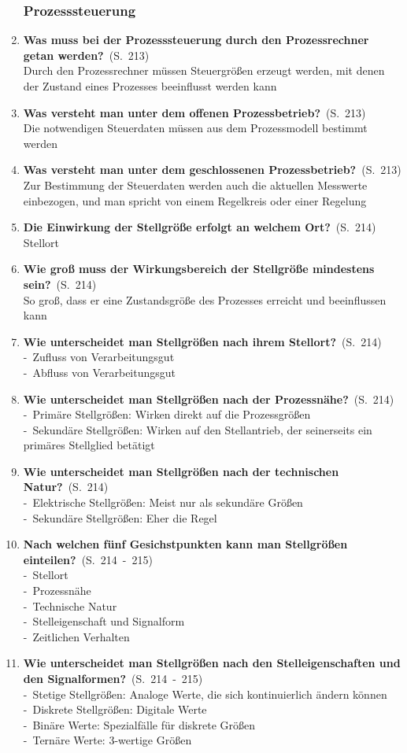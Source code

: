 \documentclass[a4paper,12pt]{article}
\newcommand{\question}[3]{\pagebreak[3]\item {\textbf{#1?}}\ (S.\ #2)#3}
\newcommand{\catchword}[1]{\\-\ #1}
\newcommand{\normaltext}[1]{\\#1}
\newcommand{\page}[1]{#1}
\newcommand{\pages}[2]{#1\ -\ #2}
\begin{document}
\begin{enumerate}
  \subsubsection{Prozesssteuerung}

  \question{Was muss bei der Prozesssteuerung durch den Prozessrechner getan werden}{\page{213}}
  {
    \normaltext{Durch den Prozessrechner müssen Steuergrößen erzeugt werden, mit denen der Zustand
                eines Prozesses beeinflusst werden kann}
  }

  \question{Was versteht man unter dem offenen Prozessbetrieb}{\page{213}}
  {
    \normaltext{Die notwendigen Steuerdaten müssen aus dem Prozessmodell bestimmt werden}
  }

  \question{Was versteht man unter dem geschlossenen Prozessbetrieb}{\page{213}}
  {
    \normaltext{Zur Bestimmung der Steuerdaten werden auch die aktuellen Messwerte einbezogen,
                und man spricht von einem Regelkreis oder einer Regelung}
  }

  \question{Die Einwirkung der Stellgröße erfolgt an welchem Ort}{\page{214}}
  {
    \normaltext{Stellort}
  }

  \question{Wie groß muss der Wirkungsbereich der Stellgröße mindestens sein}{\page{214}}
  {
    \normaltext{So groß, dass er eine Zustandsgröße des Prozesses erreicht und
                beeinflussen kann}
  }

  \question{Wie unterscheidet man Stellgrößen nach ihrem Stellort}{\page{214}}
  {
    \catchword{Zufluss von Verarbeitungsgut}
    \catchword{Abfluss von Verarbeitungsgut}
  }

  \question{Wie unterscheidet man Stellgrößen nach der Prozessnähe}{\page{214}}
  {
    \catchword{Primäre Stellgrößen: Wirken direkt auf die Prozessgrößen}
    \catchword{Sekundäre Stellgrößen: Wirken auf den Stellantrieb, der seinerseits
               ein primäres Stellglied betätigt}
  }

  \question{Wie unterscheidet man Stellgrößen nach der technischen Natur}{\page{214}}
  {
    \catchword{Elektrische Stellgrößen: Meist nur als sekundäre Größen}
    \catchword{Sekundäre Stellgrößen: Eher die Regel}
  }

  \question{Nach welchen fünf Gesichstpunkten kann man Stellgrößen einteilen}{\pages{214}{215}}
  {
    \catchword{Stellort}
    \catchword{Prozessnähe}
    \catchword{Technische Natur}
    \catchword{Stelleigenschaft und Signalform}
    \catchword{Zeitlichen Verhalten}
  }

  \question{Wie unterscheidet man Stellgrößen nach den Stelleigenschaften
            und den Signalformen}{\pages{214}{215}}
  {
    \catchword{Stetige Stellgrößen: Analoge Werte, die sich kontinuierlich ändern können}
    \catchword{Diskrete Stellgrößen: Digitale Werte}
    \catchword{Binäre Werte: Spezialfälle für diskrete Größen}
    \catchword{Ternäre Werte: 3-wertige Größen}
  }


\end{enumerate}
\end{document}
